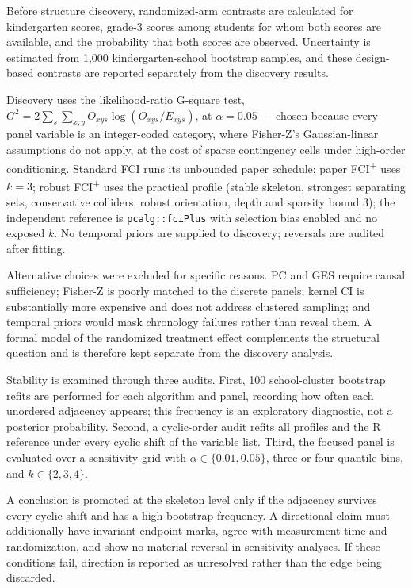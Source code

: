 \documentclass[11pt,a4paper]{article}
\theoremstyle{definition}
\newcommand{\FCIplus}{FCI\textsuperscript{+}}
\newcommand{\code}[1]{\texttt{#1}}
\begin{document}
Before structure discovery, randomized-arm contrasts are calculated for
kindergarten scores, grade-3 scores among students for whom both scores are
available, and the probability that both scores are observed. Uncertainty is
estimated from 1,000 kindergarten-school bootstrap samples, and these
design-based contrasts are reported separately from the discovery results.

Discovery uses the likelihood-ratio G-square test,
\(G^2 = 2 \sum_s \sum_{x,y} O_{xys} \log ( O_{xys} / E_{xys} )\), at
\(\alpha = 0.05\) --- chosen because every panel variable is an
integer-coded category, where Fisher-Z's Gaussian-linear assumptions do not
apply, at the cost of sparse contingency cells under high-order
conditioning. Standard FCI runs its unbounded paper schedule; paper
\FCIplus{} uses \(k = 3\); robust \FCIplus{} uses the practical profile
(stable skeleton, strongest separating sets, conservative colliders, robust
orientation, depth and sparsity bound 3); the independent reference is
\code{pcalg::fciPlus} with selection bias enabled and no exposed \(k\). No
temporal priors are supplied to discovery; reversals are audited after
fitting.

Alternative choices were excluded for specific reasons. PC and GES require
causal sufficiency; Fisher-Z is poorly matched to the discrete panels; kernel
CI is substantially more expensive and does not address clustered sampling;
and temporal priors would mask chronology failures rather than reveal them.
A formal model of the randomized treatment effect complements the structural
question and is therefore kept separate from the discovery analysis.

Stability is examined through three audits. First, 100 school-cluster
bootstrap refits are performed for each algorithm and panel, recording how
often each unordered adjacency appears; this frequency is an exploratory
diagnostic, not a posterior probability. Second, a cyclic-order audit refits
all profiles and the R reference under every cyclic shift of the variable
list. Third, the focused panel is evaluated over a sensitivity grid with
\(\alpha \in \{0.01, 0.05\}\), three or four quantile bins, and
\(k \in \{2,3,4\}\).

A conclusion is promoted at the skeleton level only if the adjacency survives
every cyclic shift and has a high bootstrap frequency. A directional claim
must additionally have invariant endpoint marks, agree with measurement time
and randomization, and show no material reversal in sensitivity analyses. If
these conditions fail, direction is reported as unresolved rather than the
edge being discarded.
\end{document}
